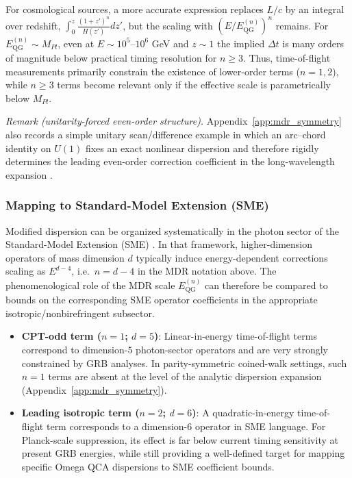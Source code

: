 For cosmological sources, a more accurate expression replaces $L/c$ by an integral over redshift, $\int_0^z \frac{(1+z')^{n}}{H(z')}dz'$, but the scaling with $(E/E^{(n)}_{\mathrm{QG}})^n$ remains. For $E^{(n)}_{\mathrm{QG}}\sim M_{Pl}$, even at $E\sim 10^5\text{--}10^6$ GeV and $z\sim 1$ the implied $\Delta t$ is many orders of magnitude below practical timing resolution for $n\ge 3$. Thus, time-of-flight measurements primarily constrain the existence of lower-order terms ($n=1,2$), while $n\ge 3$ terms become relevant only if the effective scale is parametrically below $M_{Pl}$.
\par\noindent
\textit{Remark (unitarity-forced even-order structure).} Appendix~\ref{app:mdr_symmetry} also records a simple unitary scan/difference example in which an arc--chord identity on $U(1)$ fixes an exact nonlinear dispersion and therefore rigidly determines the leading even-order correction coefficient in the long-wavelength expansion \cite{Ma2025HPA}.

\subsubsection{Mapping to Standard-Model Extension (SME)}
Modified dispersion can be organized systematically in the photon sector of the Standard-Model Extension (SME) \cite{Colladay1998,KosteleckyMewes2009}. In that framework, higher-dimension operators of mass dimension $d$ typically induce energy-dependent corrections scaling as $E^{d-4}$, i.e.\ $n=d-4$ in the MDR notation above. The phenomenological role of the MDR scale $E^{(n)}_{\mathrm{QG}}$ can therefore be compared to bounds on the corresponding SME operator coefficients in the appropriate isotropic/nonbirefringent subsector.
\begin{itemize}
    \item \textbf{CPT-odd term ($n=1$; $d=5$)}: Linear-in-energy time-of-flight terms correspond to dimension-$5$ photon-sector operators and are very strongly constrained by GRB analyses. In parity-symmetric coined-walk settings, such $n=1$ terms are absent at the level of the analytic dispersion expansion (Appendix~\ref{app:mdr_symmetry}).
    \item \textbf{Leading isotropic term ($n=2$; $d=6$)}: A quadratic-in-energy time-of-flight term corresponds to a dimension-$6$ operator in SME language. For Planck-scale suppression, its effect is far below current timing sensitivity at present GRB energies, while still providing a well-defined target for mapping specific Omega QCA dispersions to SME coefficient bounds.
\end{itemize}

